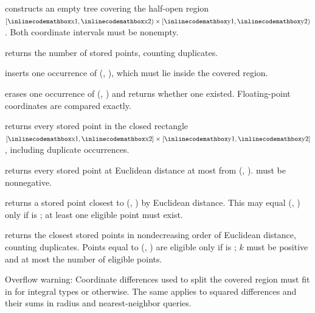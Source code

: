 \begin{compactitem}
  \item {} constructs an empty tree covering the half-open region $[{\inlinecodemath{x1}}, {\inlinecodemath{x2}}) \times [{\inlinecodemath{y1}}, {\inlinecodemath{y2}})$. Both coordinate intervals must be nonempty.
  \item {} returns the number of stored points, counting duplicates.
  \item {} inserts one occurrence of (, ), which must lie inside the covered region.
  \item {} erases one occurrence of (, ) and returns whether one existed. Floating-point coordinates are compared exactly.
  \item {} returns every stored point in the closed rectangle $[{\inlinecodemath{x1}}, {\inlinecodemath{x2}}] \times [{\inlinecodemath{y1}}, {\inlinecodemath{y2}}]$, including duplicate occurrences.
  \item {} returns every stored point at Euclidean distance at most  from (, ).  must be nonnegative.
  \item {} returns a stored point closest to (, ) by Euclidean distance. This may equal (, ) only if  is ; at least one eligible point must exist.
  \item {} returns the  closest stored points in nondecreasing order of Euclidean distance, counting duplicates. Points equal to (, ) are eligible only if  is ; $k$ must be positive and at most the number of eligible points.
\end{compactitem}

Overflow warning: Coordinate differences used to split the covered region must fit in  for integral types or  otherwise. The same applies to squared differences and their sums in radius and nearest-neighbor queries.

